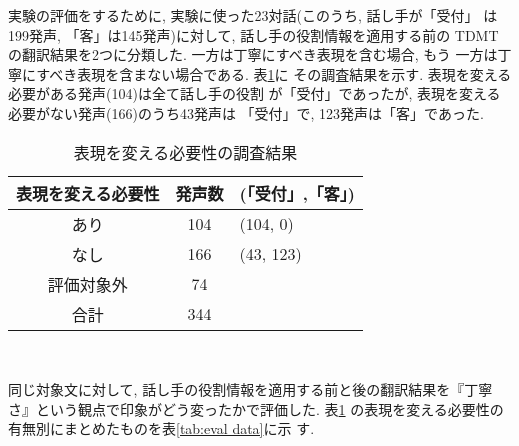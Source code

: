 実験の評価をするために, 実験に使った23対話(このうち, 話し手が「受付」
は199発声, 「客」は145発声)に対して, 話し手の役割情報を適用する前の
TDMTの翻訳結果を2つに分類した. 一方は丁寧にすべき表現を含む場合, もう
一方は丁寧にすべき表現を含まない場合である. 表\ref{tab:correct-data}に
その調査結果を示す. 表現を変える必要がある発声(104)は全て話し手の役割
が「受付」であったが, 表現を変える必要がない発声(166)のうち43発声は
「受付」で, 123発声は「客」であった. 

\begin{table}[htbp]
\tabcolsep=2mm
  \begin{center}
    \caption{表現を変える必要性の調査結果}
    \label{tab:correct-data}
    \begin{tabular}{c|cl}
      表現を変える必要性 & 発声数 & (「受付」,「客」)  \\ \hline
      あり               & 104 & (104, \hspace{4mm}0) \\
      なし               & 166 & (\hspace{2mm}43, 123)  \\ \hline
      評価対象外\footnotemark[5]  & \hspace{2mm}74 &\\ \hline \hline
      合計                        & 344 & 
    \end{tabular} \\
  \end{center}
\end{table}


同じ対象文に対して, 話し手の役割情報を適用する前と後の翻訳結果を『丁寧
さ』という観点で印象がどう変ったかで評価した. 表\ref{tab:correct-data}
の表現を変える必要性の有無別にまとめたものを表\ref{tab:eval data}に示
す. 

